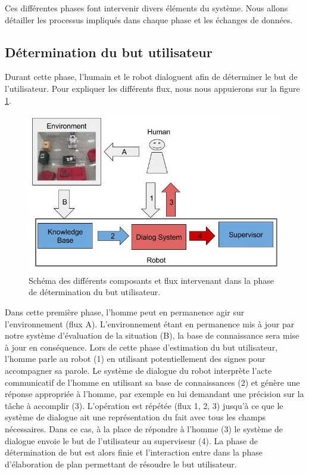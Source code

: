 \documentclass[a4paper,11pt,twoside]{StyleThese}
\begin{document}
Ces différentes phases font intervenir divers éléments du système.
Nous allons détailler les processus impliqués dans chaque phase et les échanges de données.

\subsection{Détermination du but utilisateur}
\label{sec:phase1}
Durant cette phase, l'humain et le robot dialoguent afin de déterminer le but de l'utilisateur. Pour expliquer les différents flux, nous nous appuierons sur la figure \ref{fig:phase1}.


\begin{figure}[ht!]
 \centering
  \includegraphics[width=0.99\linewidth]{./img/phase1color.jpg} 
  \caption {Schéma des différents composants et flux intervenant dans la phase de détermination du but utilisateur.}
  \label{fig:phase1}
\end{figure}

Dans cette première phase, l'homme peut en permanence agir sur l'environnement (flux A). L'environnement étant en permanence mis à jour par notre système d'évaluation de la situation (B), la base de connaissance sera mise à jour en conséquence.
Lors de cette phase d'estimation du but utilisateur, l'homme parle au robot (1) en utilisant potentiellement des signes pour accompagner sa parole. Le système de dialogue du robot interprète l'acte communicatif de l'homme en utilisant sa base de connaissances (2) et génère une réponse appropriée à l'homme, par exemple en lui demandant une précision sur la tâche à accomplir (3). L'opération est répétée (flux 1, 2, 3) jusqu'à ce que le système de dialogue ait une représentation du fait avec tous les champs nécessaires. Dans ce cas, à la place de répondre à l'homme (3) le système de dialogue envoie le but de l'utilisateur au superviseur (4). La phase de détermination de but est alors finie et l'interaction entre dans la phase d'élaboration de plan permettant de résoudre le but utilisateur. 
\end{document}
